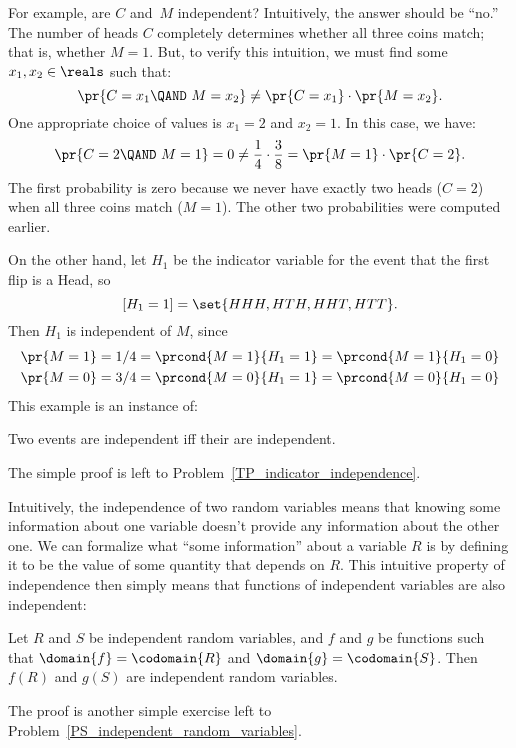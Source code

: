 For example, are $C$ and~$M$ independent?  Intuitively, the answer
should be ``no.''  The number of heads $C$ completely determines
whether all three coins match; that is, whether $M = 1$.  But, to
verify this intuition, we must find some $x_1, x_2 \in \reals$ such
that:
\[
\pr{C = x_1 \QAND\ M = x_2} \neq \pr{C = x_1} \cdot \pr{M = x_2}.
\]
One appropriate choice of values is $x_1 = 2$ and $x_2 = 1$.
In this case, we have:
\[
\pr{C = 2 \QAND\ M = 1} = 0 \neq \dfrac{1}{4} \cdot \dfrac{3}{8} = \pr{M
= 1} \cdot \pr{C = 2}.
\]
The first probability is zero because we never have exactly two heads ($C
= 2$) when all three coins match ($M = 1$).  The other two probabilities
were computed earlier.

On the other hand, let $H_1$ be the indicator variable for the event that the
first flip is a Head, so
\[
[H_1 = 1] = \set{HHH, HTH, HHT, HTT}.
\]
Then $H_1$ is independent of $M$, since
\begin{align*}
\pr{M=1} & = 1/4 = \prcond{M=1}{H_1=1} = \prcond{M=1}{H_1=0}\\
\pr{M=0} & = 3/4 = \prcond{M=0}{H_1=1} = \prcond{M=0}{H_1=0}
\end{align*}
This example is an instance of:
\begin{lemma}\label{lem:indicator-indep}
  Two events are independent iff their  are
  independent.
\end{lemma}
The simple proof is left to Problem~\ref{TP_indicator_independence}.

Intuitively, the independence of two random variables means that
knowing some information about one variable doesn't provide any
information about the other one.  We can formalize what ``some
information'' about a variable $R$ is by defining it to be the value
of some quantity that depends on $R$.  This intuitive property of
independence then simply means that functions of independent variables
are also independent:

\begin{lemma}\label{lem:function-indep}
  Let $R$ and $S$ be independent random variables, and $f$ and $g$ be
  functions such that $\domain{f} = \codomain{R}$ and $\domain{g} =
  \codomain{S}$.  Then $f(R)$ and $g(S)$ are independent random
  variables.
\end{lemma}
The proof is another simple exercise left to
Problem~\ref{PS_independent_random_variables}.

